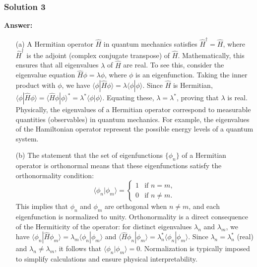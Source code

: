 \documentclass{article}
\begin{document}
\subsubsection{Solution 3}
\noindent \textbf{Answer:}

\begin{enumerate}
    \item[(a)] A Hermitian operator $\hat{H}$ in quantum mechanics satisfies $\hat{H}^\dagger = \hat{H}$, where $\hat{H}^\dagger$ is the adjoint (complex conjugate transpose) of $\hat{H}$. Mathematically, this ensures that all eigenvalues $\lambda$ of $\hat{H}$ are real. To see this, consider the eigenvalue equation $\hat{H} \phi = \lambda \phi$, where $\phi$ is an eigenfunction. Taking the inner product with $\phi$, we have $\langle \phi | \hat{H} \phi \rangle = \lambda \langle \phi | \phi \rangle$. Since $\hat{H}$ is Hermitian, $\langle \phi | \hat{H} \phi \rangle = \langle \hat{H} \phi | \phi \rangle^* = \lambda^* \langle \phi | \phi \rangle$. Equating these, $\lambda = \lambda^*$, proving that $\lambda$ is real. Physically, the eigenvalues of a Hermitian operator correspond to measurable quantities (observables) in quantum mechanics. For example, the eigenvalues of the Hamiltonian operator represent the possible energy levels of a quantum system.

    \item[(b)] The statement that the set of eigenfunctions $\{\phi_n\}$ of a Hermitian operator is orthonormal means that these eigenfunctions satisfy the orthonormality condition:
    \[
    \langle \phi_n | \phi_m \rangle = 
    \begin{cases} 
    1 & \text{if } n = m, \\
    0 & \text{if } n \neq m.
    \end{cases}
    \]
    This implies that $\phi_n$ and $\phi_m$ are orthogonal when $n \neq m$, and each eigenfunction is normalized to unity. Orthonormality is a direct consequence of the Hermiticity of the operator: for distinct eigenvalues $\lambda_n$ and $\lambda_m$, we have $\langle \phi_n | \hat{H} \phi_m \rangle = \lambda_m \langle \phi_n | \phi_m \rangle$ and $\langle \hat{H} \phi_n | \phi_m \rangle = \lambda_n^* \langle \phi_n | \phi_m \rangle$. Since $\lambda_n = \lambda_n^*$ (real) and $\lambda_n \neq \lambda_m$, it follows that $\langle \phi_n | \phi_m \rangle = 0$. Normalization is typically imposed to simplify calculations and ensure physical interpretability.
\end{enumerate}
\end{document}
